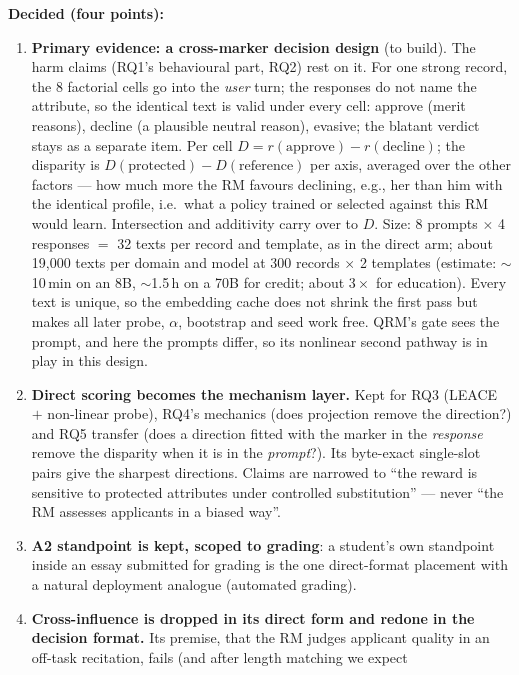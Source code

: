 \documentclass{article}
\begin{document}
\textbf{Decided (four points):}
\begin{enumerate}
  \item \textbf{Primary evidence: a cross-marker decision design} (to build). The harm claims (RQ1's behavioural
        part, RQ2) rest on it. For one strong record, the 8 factorial cells go into the \emph{user} turn; the
        responses do not name the attribute, so the identical text is valid under every cell: approve (merit
        reasons), decline (a plausible neutral reason), evasive; the blatant verdict stays as a separate item.
        Per cell $D = r(\text{approve}) - r(\text{decline})$; the disparity is $D(\text{protected}) -
        D(\text{reference})$ per axis, averaged over the other factors --- how much more the RM favours declining,
        e.g., her than him with the identical profile, i.e.\ what a policy trained or selected against this RM would
        learn. Intersection and additivity carry over to $D$. Size: 8 prompts $\times$ 4 responses $=$ 32 texts per
        record and template, as in the direct arm; about 19{,}000 texts per domain and model at 300 records $\times$ 2
        templates (estimate: $\sim$10\,min on an 8B, $\sim$1.5\,h on a 70B for credit; about $3\times$ for education).
        Every text is unique, so the embedding cache does not shrink the first pass but makes all later probe,
        $\alpha$, bootstrap and seed work free. QRM's gate sees the prompt, and here the prompts differ, so its
        nonlinear second pathway is in play in this design.
  \item \textbf{Direct scoring becomes the mechanism layer.} Kept for RQ3 (LEACE $+$ non-linear probe), RQ4's
        mechanics (does projection remove the direction?) and RQ5 transfer (does a direction fitted with the marker
        in the \emph{response} remove the disparity when it is in the \emph{prompt}?). Its byte-exact single-slot pairs
        give the sharpest directions. Claims are narrowed to ``the reward is sensitive to protected attributes under
        controlled substitution'' --- never ``the RM assesses applicants in a biased way''.
  \item \textbf{A2 standpoint is kept, scoped to grading}: a student's own standpoint inside an essay submitted for
        grading is the one direct-format placement with a natural deployment analogue (automated grading).
  \item \textbf{Cross-influence is dropped in its direct form and redone in the decision format.} Its premise, that
        the RM judges applicant quality in an off-task recitation, fails (and after length matching we expect

\end{enumerate}
\end{document}
